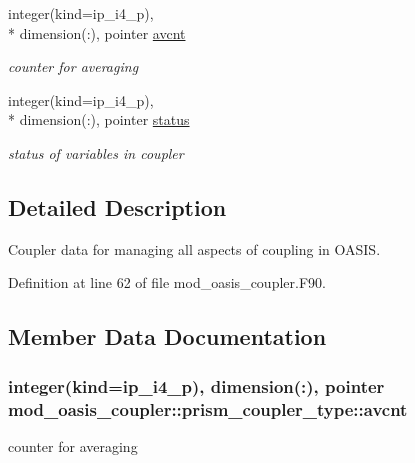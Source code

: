\begin{DoxyCompactItemize}
integer(kind=ip\+\_\+i4\+\_\+p), \\*
dimension(\+:), pointer \hyperlink{structmod__oasis__coupler_1_1prism__coupler__type_accd8eb166c6aac75690be947dec43ccc}{avcnt}
\begin{DoxyCompactList}\small\item\em counter for averaging \end{DoxyCompactList}\item 
integer(kind=ip\+\_\+i4\+\_\+p), \\*
dimension(\+:), pointer \hyperlink{structmod__oasis__coupler_1_1prism__coupler__type_aee26373fa4a84f3c4e1841ba702f161c}{status}
\begin{DoxyCompactList}\small\item\em status of variables in coupler \end{DoxyCompactList}\end{DoxyCompactItemize}


\subsection{Detailed Description}
Coupler data for managing all aspects of coupling in O\+A\+S\+I\+S. 

Definition at line 62 of file mod\+\_\+oasis\+\_\+coupler.\+F90.



\subsection{Member Data Documentation}
\hypertarget{structmod__oasis__coupler_1_1prism__coupler__type_accd8eb166c6aac75690be947dec43ccc}{
\subsubsection[{avcnt}]{\setlength{\rightskip}{0pt plus 5cm}integer(kind=ip\+\_\+i4\+\_\+p), dimension(\+:), pointer mod\+\_\+oasis\+\_\+coupler\+::prism\+\_\+coupler\+\_\+type\+::avcnt\hspace{0.3cm}{\ttfamily [private]}}}\label{structmod__oasis__coupler_1_1prism__coupler__type_accd8eb166c6aac75690be947dec43ccc}


counter for averaging 



